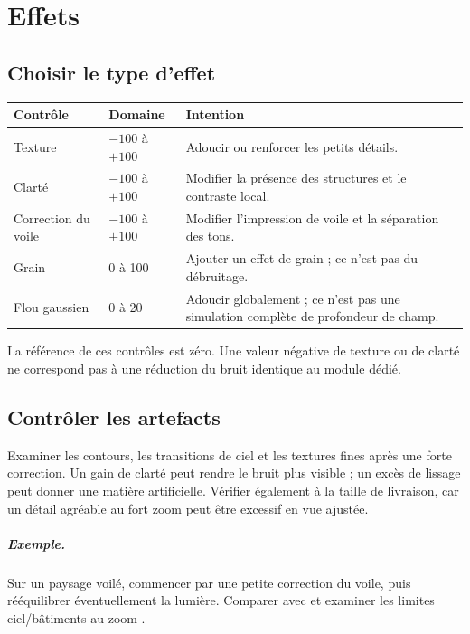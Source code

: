 \chapter{Effets}
\section{Choisir le type d’effet}
\begin{longtable}{@{}L{3.6cm}L{2.8cm}L{7.2cm}@{}}
\toprule Contrôle & Domaine & Intention\\\midrule\endhead
Texture & $-100$ à $+100$ & Adoucir ou renforcer les petits détails.\\
Clarté & $-100$ à $+100$ & Modifier la présence des structures et le contraste local.\\
Correction du voile & $-100$ à $+100$ & Modifier l’impression de voile et la séparation des tons.\\
Grain & 0 à 100 & Ajouter un effet de grain ; ce n’est pas du débruitage.\\
Flou gaussien & 0 à 20 & Adoucir globalement ; ce n’est pas une simulation complète de profondeur de champ.\\
\bottomrule
\end{longtable}
La référence de ces contrôles est zéro. Une valeur négative de texture ou
de clarté ne correspond pas à une réduction du bruit identique au module dédié.

\section{Contrôler les artefacts}
Examiner les contours, les transitions de ciel et les textures fines après
une forte correction. Un gain de clarté peut rendre le bruit plus visible ;
un excès de lissage peut donner une matière artificielle. Vérifier également
à la taille de livraison, car un détail agréable au fort zoom peut être excessif
en vue ajustée.

\paragraph{Exemple.}
Sur un paysage voilé, commencer par une petite correction du voile, puis
rééquilibrer éventuellement la lumière. Comparer avec 
et examiner les limites ciel/bâtiments au zoom .
\gestesreglages
